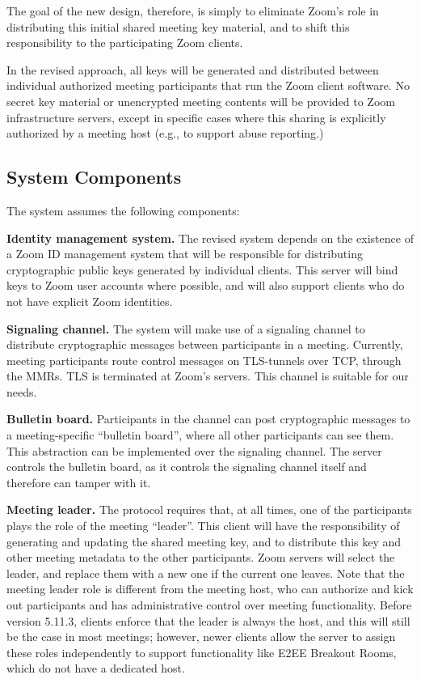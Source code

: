 The goal of the new design, therefore, is simply to eliminate Zoom's role in distributing this initial shared meeting key material, and to shift this responsibility to the participating Zoom clients.

In the revised approach, all keys will be generated and distributed between individual authorized meeting participants that run the Zoom client software. No secret key material or unencrypted meeting contents will be provided to Zoom infrastructure servers, except in specific cases where this sharing is explicitly authorized by a meeting host (e.g., to support abuse reporting.)

\subsection{System Components}
\label{subsec:comp}

The system assumes the following components:
\begin{description}
\item {\bf Identity management system.} The revised system depends on the existence of a Zoom ID management system that will be responsible for distributing cryptographic public keys generated by individual clients. This server will bind keys to Zoom user accounts where possible, and will also support clients who do not have explicit Zoom identities.

\item {\bf Signaling channel.} The system will make use of a signaling channel to distribute cryptographic messages between participants in a meeting. Currently, meeting participants route control messages on TLS-tunnels over TCP, through the MMRs. TLS is terminated at Zoom's servers. This channel is suitable for our needs.

\item {\bf Bulletin board.} Participants in the channel can post cryptographic messages to a meeting-specific ``bulletin board'', where all other participants can see them. This abstraction can be implemented over the signaling channel. The server controls the bulletin board, as it controls the signaling channel itself and therefore can tamper with it.

\item {\bf Meeting leader.} The protocol requires that, at all times, one of the participants plays the role of the meeting ``leader''. This client will have the responsibility of generating and updating the shared meeting key, and to distribute this key and other meeting metadata to the other participants. Zoom servers will select the leader, and replace them with a new one if the current one leaves. Note that the meeting leader role is different from the meeting host, who can authorize and kick out participants and has administrative control over meeting functionality. Before version 5.11.3, clients enforce that the leader is always the host, and this will still be the case in most meetings; however, newer clients allow the server to assign these roles independently to support functionality like E2EE Breakout Rooms, which do not have a dedicated host.

\end{description}

